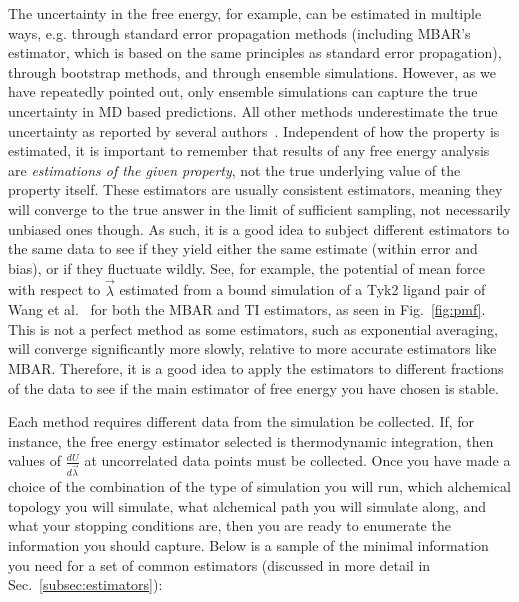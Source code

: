 \documentclass[9pt,bestpractices]{livecoms}
\begin{document}
The uncertainty in the free energy, for example, can be estimated in multiple ways, e.g. through standard error propagation methods (including MBAR's estimator, which is based on the same principles as standard error propagation), through bootstrap methods, and through ensemble simulations. However, as we have repeatedly pointed out, only ensemble simulations can capture the true uncertainty in MD based predictions. All other methods underestimate the true uncertainty as reported by several authors~\cite{wan2020fep+, wan2021uq, vassaux2021, gapsys2020large, wade2022, bhati2017, bhati2022, bhati2025, wan2023eqvsneq, bhati2018, bhati2019}. 
Independent of how the property is estimated, it is important to remember that results of any free energy analysis are \textit{estimations of the given property}, not the true underlying value of the property itself. 
These estimators are usually consistent estimators, meaning they will converge to the true answer in the limit of sufficient sampling, not necessarily unbiased ones though.
As such, it is a good idea to subject different estimators to the same data to see if they yield either the same estimate (within error and bias), or if they fluctuate wildly. See, for example, the potential of mean force with respect to $\vec{\lambda}$ estimated from a bound simulation of a Tyk2 ligand pair of Wang et al.~\cite{wang2015accurate} for both the MBAR and TI estimators, as seen in Fig.~\ref{fig:pmf}.
This is not a perfect method as some estimators, such as exponential averaging, will converge significantly more slowly, relative to more accurate estimators like MBAR. 
Therefore, it is a good idea to apply the estimators to different fractions of the data to see if the main estimator of free energy you have chosen is stable.

Each method requires different data from the simulation be collected. If, for instance, the free energy estimator selected is thermodynamic integration, then values of $\frac{dU}{d\vec{\lambda}}$ at uncorrelated data points must be collected. Once you have made a choice of the combination of the type of simulation you will run, which alchemical topology you will simulate, what alchemical path you will simulate along, and what your stopping conditions are, then you are ready to enumerate the information you should capture. Below is a sample of the minimal information you need for a set of common estimators (discussed in more detail in Sec.~\ref{subsec:estimators}):
\end{document}
